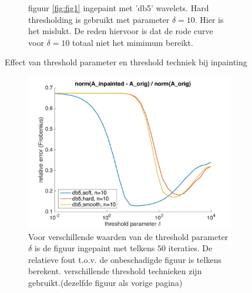 \begin{figure}
\begin{subfigure}[b]{0.45\textwidth}
        \caption{figuur \ref{fig:fig1} ingepaint met 'db5' wavelets. Hard thresholding is gebruikt met parameter $\delta = 10$. Hier is het mislukt. De reden hiervoor is dat de  rode curve voor $\delta = 10$ totaal niet het mimimum bereikt.}
        \label{fig:mouse}
    \end{subfigure}
    \caption{Effect van threshold parameter en threshold techniek bij inpainting}\label{fig:baboon}
\end{figure}

\begin{figure}
    \centering
    \begin{subfigure}[b]{0.7\textwidth}
        \includegraphics[width=\textwidth]{../src/inpainting/paint_letters_db5_threskinds_it50}
        \caption{Voor verschillende waarden van de threshold parameter $\delta$ is de figuur ingepaint met telkens $50$ iteraties. De relatieve fout t.o.v. de onbeschadigde figuur is telkens berekent. verschillende threshold technieken zijn gebruikt.(dezelfde figuur als vorige pagina)}
        \label{fig:tiger}
    \end{subfigure}
    ~ %
    \begin{subfigure}[b]{0.7\textwidth}

\end{subfigure}
\end{figure}
